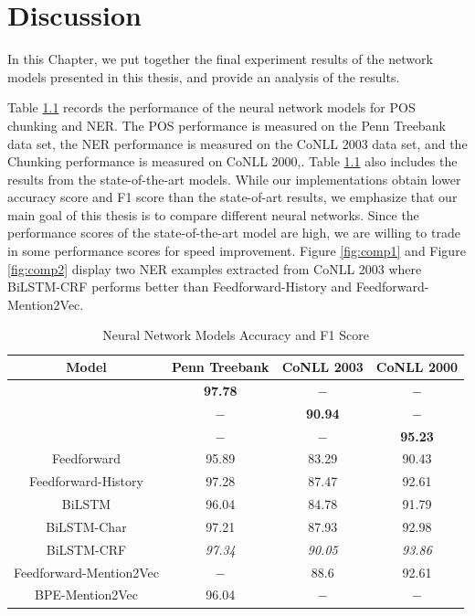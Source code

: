 \chapter{Discussion}

In this Chapter, we put together the final experiment results of the network models presented in this thesis, and provide an analysis of the results.

Table \ref{table:my-label1} records the performance of the neural network models for POS chunking and NER. The POS performance is measured on the Penn Treebank data set, the NER performance is measured on the CoNLL 2003 data set, and the Chunking performance is measured on CoNLL 2000,. Table \ref{table:my-label1} also includes the results from the state-of-the-art models. While our implementations obtain lower accuracy score and F1 score than the state-of-art results, we emphasize that our main goal of this thesis is to compare different neural networks. Since the performance scores of the state-of-the-art model are high, we are willing to trade in some performance scores for speed improvement. Figure \ref{fig:comp1} and Figure \ref{fig:comp2} display two NER examples extracted from CoNLL 2003 where BiLSTM-CRF performs better than Feedforward-History and Feedforward-Mention2Vec. 


\begin{table}[h]
\centering
\caption{Neural Network Models Accuracy and F1 Score}
\label{table:my-label1}
\begin{tabular}{|c|c|c|c|}
\hline
Model        & Penn Treebank & CoNLL 2003 & CoNLL 2000     \\ \hline
\text{\cite{ling2015finding}} & \textbf{97.78} & $-$ & $-$ \\ \hline
\text{\cite{lample2016neural}} & $-$ & \textbf{90.94}  & $-$\\ \hline 
\text{\cite{shen2005voting}} & $-$  & $-$ & \textbf{95.23}\\ \hline 
Feedforward    & 95.89          & 83.29   & 90.43  \\ \hline
Feedforward-History & 97.28     & 87.47   & 92.61     \\ \hline
BiLSTM  & 96.04     & 84.78     & 91.79         \\ \hline
BiLSTM-Char & 97.21 & 87.93     & 92.98       \\ \hline
BiLSTM-CRF & \textit{97.34}  & \textit{90.05}  & \textit{93.86}     \\ \hline
Feedforward-Mention2Vec  & $-$    & 88.6  & 92.61  \\ \hline
BPE-Mention2Vec & 96.04  & $-$   & $-$   \\ \hline   
\end{tabular}
\end{table}



